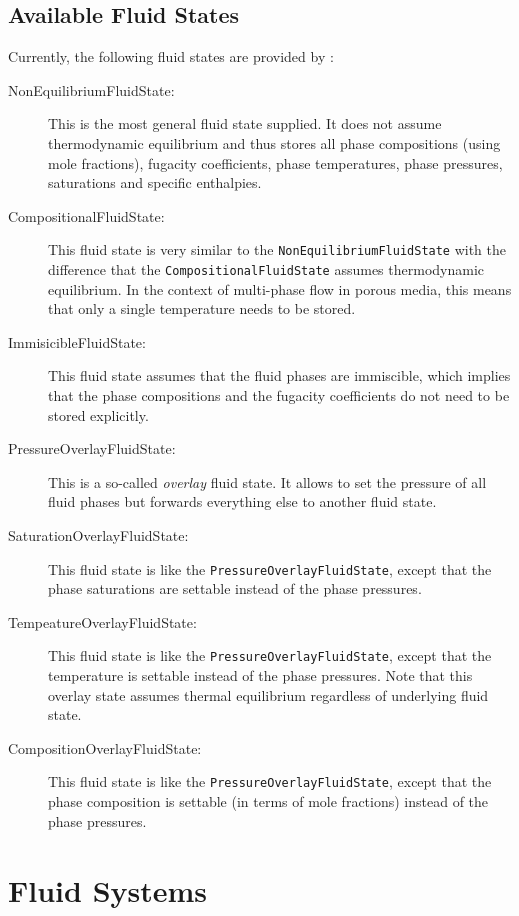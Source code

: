 \subsection{Available Fluid States}
Currently, the following fluid states are provided by \eWoms:
\begin{description}
\item[NonEquilibriumFluidState:] This is the most general fluid state
  supplied. It does not assume thermodynamic equilibrium and thus
  stores all phase compositions (using mole fractions), fugacity
  coefficients, phase temperatures, phase pressures, saturations and
  specific enthalpies.
\item[CompositionalFluidState:] This fluid state is very similar to
  the \texttt{Non\-Equilibrium\-Fluid\-State} with the difference that
  the \texttt{Compositional\-Fluid\-State} assumes thermodynamic
  equilibrium. In the context of multi-phase flow in porous media,
  this means that only a single temperature needs to be stored.
\item[ImmisicibleFluidState:] This fluid state assumes that the fluid
  phases are immiscible, which implies that the phase compositions and
  the fugacity coefficients do not need to be stored explicitly.
\item[PressureOverlayFluidState:] This is a so-called {\em overlay}
  fluid state. It allows to set the pressure of all fluid phases but
  forwards everything else to another fluid state.
\item[SaturationOverlayFluidState:] This fluid state is like the
  \texttt{PressureOverlayFluidState}, except that the phase
  saturations are settable instead of the phase pressures.
\item[TempeatureOverlayFluidState:] This fluid state is like the
  \texttt{PressureOverlayFluidState}, except that the temperature is
  settable instead of the phase pressures. Note that this overlay
  state assumes thermal equilibrium regardless of underlying fluid
  state.
\item[CompositionOverlayFluidState:] This fluid state is like the
  \texttt{PressureOverlayFluidState}, except that the phase
  composition is settable (in terms of mole fractions) instead of the
  phase pressures.
\end{description}

\section{Fluid Systems}

